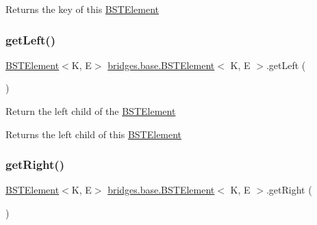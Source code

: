 \begin{DoxyReturn}{Returns}
the key of this \mbox{\hyperlink{classbridges_1_1base_1_1_b_s_t_element}{B\+S\+T\+Element}} 
\end{DoxyReturn}
\mbox{\label{classbridges_1_1base_1_1_b_s_t_element_a8abdd6e4a0486de7fa45fbb233b56688}} 
\subsubsection{\texorpdfstring{get\+Left()}{getLeft()}}
{\footnotesize\ttfamily \mbox{\hyperlink{classbridges_1_1base_1_1_b_s_t_element}{B\+S\+T\+Element}}$<$K, E$>$ \mbox{\hyperlink{classbridges_1_1base_1_1_b_s_t_element}{bridges.\+base.\+B\+S\+T\+Element}}$<$ K, E $>$.get\+Left (\begin{DoxyParamCaption}{ }\end{DoxyParamCaption})}

Return the left child of the \mbox{\hyperlink{classbridges_1_1base_1_1_b_s_t_element}{B\+S\+T\+Element}}

\begin{DoxyReturn}{Returns}
the left child of this \mbox{\hyperlink{classbridges_1_1base_1_1_b_s_t_element}{B\+S\+T\+Element}} 
\end{DoxyReturn}
\mbox{\label{classbridges_1_1base_1_1_b_s_t_element_ae7ed1b98f48acfcfc0a3a5bf6219ce00}} 
\subsubsection{\texorpdfstring{get\+Right()}{getRight()}}
{\footnotesize\ttfamily \mbox{\hyperlink{classbridges_1_1base_1_1_b_s_t_element}{B\+S\+T\+Element}}$<$K, E$>$ \mbox{\hyperlink{classbridges_1_1base_1_1_b_s_t_element}{bridges.\+base.\+B\+S\+T\+Element}}$<$ K, E $>$.get\+Right (\begin{DoxyParamCaption}{ }\end{DoxyParamCaption})}


